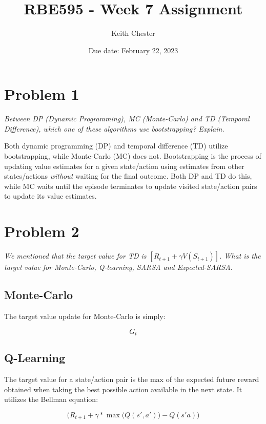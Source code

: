 \documentclass{article}
\title{RBE595 - Week 7 Assignment}
\author{Keith Chester}
\date{Due date: February 22, 2023}
\begin{document}
\maketitle

\section*{Problem 1}
\textit{Between DP (Dynamic Programming), MC (Monte-Carlo) and TD (Temporal Difference), which
    one of these algorithms use bootstrapping? Explain. }

Both dynamic programming (DP) and temporal difference (TD) utilize bootstrapping, while Monte-Carlo (MC) does not. Bootstrapping is the process of updating value estimates for a given state/action using estimates from other states/actions \textit{without} waiting for the final outcome. Both DP and TD do this, while MC waits until the episode terminates to update visited state/action pairs to update its value estimates.

\section*{Problem 2}
\textit{We mentioned that the target value for TD is $[R_{t+1} + \gamma V(S_{t+1})]$. What is the target value for Monte-Carlo, Q-learning, SARSA and Expected-SARSA.}

\subsection*{Monte-Carlo}

The target value update for Monte-Carlo is simply:

\begin{equation}
    G_t
\end{equation}

\subsection*{Q-Learning}

The target value for a state/action pair is the max of the expected future reward obtained when taking the best possible action available in the next state. It utilizes the Bellman equation:

\begin{equation}
    \biggl( R_{t+1} + \gamma * \max\bigl(Q(s',a')\bigr) - Q(s'a) \biggr)
\end{equation}
\end{document}

